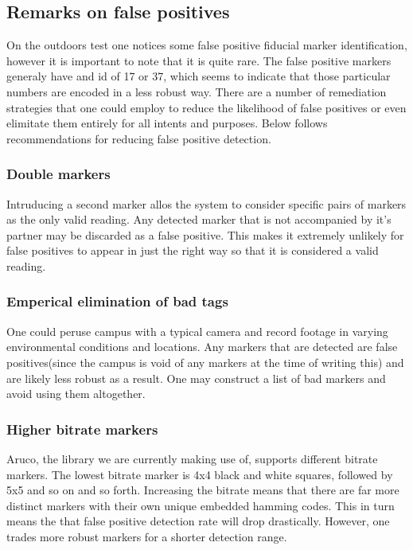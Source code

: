 \subsection{Remarks on false positives}
On the outdoors test one notices some false positive fiducial marker identification, however it is important to note that it is quite rare. The false positive markers generaly have and id of 17 or 37, which seems to indicate that those particular numbers are encoded in a less robust way. There are a number of remediation strategies that one could employ to reduce the likelihood of false positives or even elimitate them entirely for all intents and purposes. Below follows recommendations for reducing false positive detection.
\subsubsection{Double markers}
Intruducing a second marker allos the system to consider specific pairs of markers as the only valid reading. Any detected marker that is not accompanied by it's partner may be discarded as a false positive. This makes it extremely unlikely for false positives to appear in just the right way so that it is considered a valid reading.
\subsubsection{Emperical elimination of bad tags}
One could peruse campus with a typical camera and record footage in varying environmental conditions and locations. Any markers that are detected are false positives(since the campus is void of any markers at the time of writing this) and are likely less robust as a result. One may construct a list of bad markers and avoid using them altogether.
\subsubsection{Higher bitrate markers}
Aruco, the library we are currently making use of, supports different bitrate markers. The lowest bitrate marker is 4x4 black and white squares, followed by 5x5 and so on and so forth. Increasing the bitrate means that there are far more distinct markers with their own unique embedded hamming codes. This in turn means the that false positive detection rate will drop drastically. However, one trades more robust markers for a shorter detection range.
